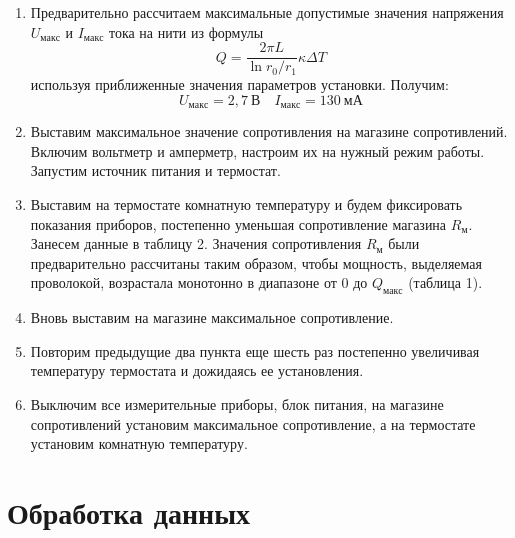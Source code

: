 \documentclass[14pt, a4paper]{report}
\begin{document}
\begin{enumerate}

\item Предварительно рассчитаем максимальные допустимые значения напряжения $U_{макс}$ и $I_{макс}$ тока на нити из формулы
\[Q=\frac{2\pi L}{\ln r_0/r_1}\kappa\Delta T\]
используя приближенные значения параметров установки. Получим:
\[U_{макс}=2,7\ В\quad I_{макс}=130\ мА\]

\item Выставим максимальное значение сопротивления на магазине сопротивлений. Включим вольтметр и амперметр, настроим их на нужный режим работы. Запустим источник питания и термостат.

\item Выставим на термостате комнатную температуру и будем фиксировать показания приборов, постепенно уменьшая сопротивление магазина $R_м$. Занесем данные в таблицу 2.
Значения сопротивления $R_м$ были предварительно рассчитаны таким образом, чтобы мощность, выделяемая проволокой, возрастала монотонно в диапазоне от $0$ до $Q_{макс}$ (таблица 1).

\item Вновь выставим на магазине максимальное сопротивление.

\item Повторим предыдущие два пункта еще шесть раз постепенно увеличивая температуру термостата и дожидаясь ее установления.

\item Выключим все измерительные приборы, блок питания, на магазине сопротивлений установим максимальное сопротивление, а на термостате установим комнатную температуру.

\end{enumerate}

\section{Обработка данных}
\end{document}
